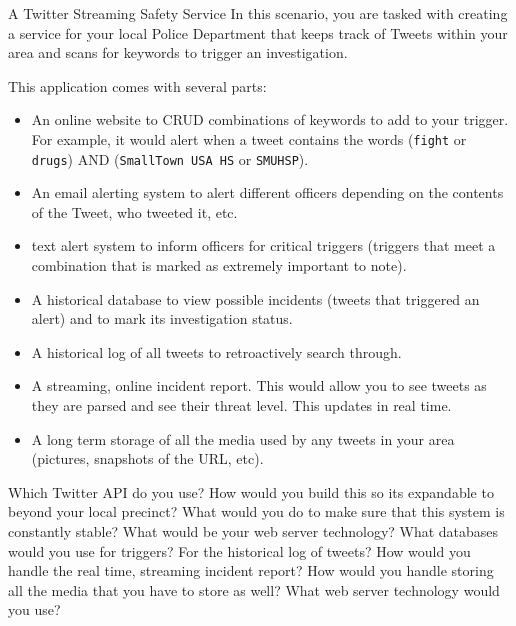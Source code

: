 \documentclass{homework}
\begin{document}
\newpage
\begin{problem}[3]{A Twitter Streaming Safety Service}
    In this scenario, you are tasked with creating a service for your local Police Department that keeps track of Tweets within your area and scans for keywords to trigger an investigation.
    
    \vskip 1mm
   
    This application comes with several parts:
    \begin{itemize}
        \item An online website to CRUD combinations of keywords to add to your trigger. For example, it would alert when a tweet contains the words (\texttt{fight} or \texttt{drugs}) AND (\texttt{SmallTown USA HS} or \texttt{SMUHSP}).
        \item An email alerting system to alert different officers depending on the contents of the Tweet, who tweeted it, etc.
        \item text alert system to inform officers for critical triggers (triggers that meet a combination that is marked as extremely important to note).
        \item A historical database to view possible incidents (tweets that triggered an alert) and to mark its investigation status.
        \item A historical log of all tweets to retroactively search through.
        \item A streaming, online incident report. This would allow you to see tweets as they are parsed and see their threat level. This updates in real time.
        \item A long term storage of all the media used by any tweets in your area (pictures, snapshots of the URL, etc).
    \end{itemize}
    Which Twitter API do you use? How would you build this so its expandable to beyond your local precinct? What would you do to make sure that this system is constantly stable? What would be your web server technology? What databases would you use for triggers? For the historical log of tweets? How would you handle the real time, streaming incident report? How would you handle storing all the media that you have to store as well? What web server technology would you use?
\end{problem}
\end{document}
